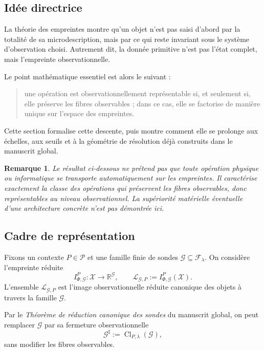 \documentclass[11pt,a4paper]{article}
\newtheorem{remark}{Remarque}
\begin{document}
\begin{appendices}
\subsection{Idée directrice}

La théorie des empreintes montre qu'un objet n'est pas saisi d'abord par la totalité de sa microdescription, mais par ce qui reste invariant sous le système d'observation choisi. Autrement dit, la donnée primitive n'est pas l'état complet, mais l'empreinte observationnelle.

Le point mathématique essentiel est alors le suivant :

\begin{quote}
une opération est observationnellement représentable si, et seulement si, elle préserve les fibres observables ; dans ce cas, elle se factorise de manière unique sur l'espace des empreintes.
\end{quote}

Cette section formalise cette descente, puis montre comment elle se prolonge aux échelles, aux seuils et à la géométrie de résolution déjà construits dans le manuscrit global.

\begin{remark}
Le résultat ci-dessous ne prétend pas que toute opération physique ou informatique se transporte automatiquement sur les empreintes. Il caractérise exactement la classe des opérations qui préservent les fibres observables, donc représentables au niveau observationnel. La supériorité matérielle éventuelle d'une architecture concrète n'est pas démontrée ici.
\end{remark}

\subsection{Cadre de représentation}

Fixons un contexte \(P\in\mathcal P\) et une famille finie de sondes \(\mathcal G\subseteq\mathcal F_\lambda\). On considère l'empreinte réduite
\[
I_{\Phi,\mathcal G}^P:\mathcal X\longrightarrow \mathbb R^{\mathcal G},
\qquad
\mathcal L_{\mathcal G,P}:=I_{\Phi,\mathcal G}^P(\mathcal X).
\]
L'ensemble \(\mathcal L_{\mathcal G,P}\) est l'image observationnelle réduite canonique des objets à travers la famille \(\mathcal G\).

Par le \emph{Théorème de réduction canonique des sondes} du manuscrit global, on peut remplacer \(\mathcal G\) par sa fermeture observationnelle
\[
\mathcal G^\sharp:=\operatorname{Cl}_{P,\lambda}(\mathcal G),
\]
sans modifier les fibres observables.


\end{appendices}
\end{document}
